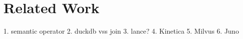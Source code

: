 \section{Related Work}\label{sec:related}

1. semantic operator
2. duckdb vss join
3. lance?
4. Kinetica
5. Milvus
6. Juno